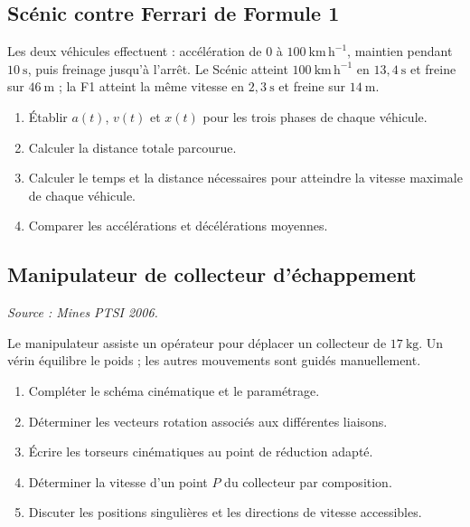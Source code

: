 \subsection{Scénic contre Ferrari de Formule 1}

Les deux véhicules effectuent : accélération de 0 à
$100\ \mathrm{km\,h^{-1}}$, maintien pendant $10\ \mathrm s$, puis
freinage jusqu'à l'arrêt. Le Scénic atteint $100\ \mathrm{km\,h^{-1}}$
en $13{,}4\ \mathrm s$ et freine sur $46\ \mathrm m$ ; la F1 atteint
la même vitesse en $2{,}3\ \mathrm s$ et freine sur $14\ \mathrm m$.

\begin{center}
\hfill
{}
\end{center}

\begin{enumerate}
  \item Établir $a(t)$, $v(t)$ et $x(t)$ pour les trois phases de chaque véhicule.
  \item Calculer la distance totale parcourue.
  \item Calculer le temps et la distance nécessaires pour atteindre la vitesse maximale de chaque véhicule.
  \item Comparer les accélérations et décélérations moyennes.
\end{enumerate}

\subsection{Manipulateur de collecteur d'échappement}

\textit{Source : Mines PTSI 2006.}

Le manipulateur assiste un opérateur pour déplacer un collecteur de
$17\ \mathrm{kg}$. Un vérin équilibre le poids ; les autres mouvements
sont guidés manuellement.

\begin{center}
\hfill
{}\hfill
{}
\end{center}

\begin{enumerate}
  \item Compléter le schéma cinématique et le paramétrage.
  \item Déterminer les vecteurs rotation associés aux différentes liaisons.
  \item Écrire les torseurs cinématiques au point de réduction adapté.
  \item Déterminer la vitesse d'un point $P$ du collecteur par composition.
  \item Discuter les positions singulières et les directions de vitesse accessibles.
\end{enumerate}


